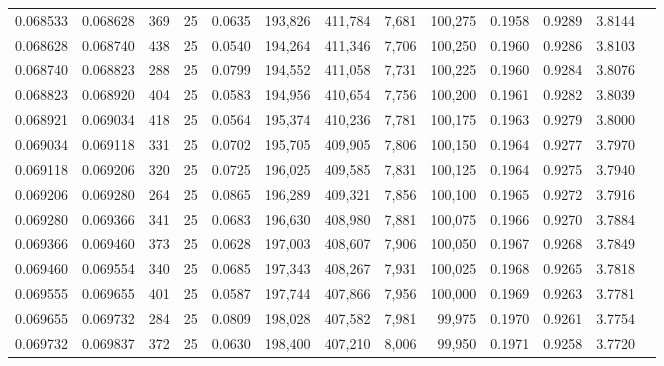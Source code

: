 \begin{tabular}{rrrrrrrrrrrrr}
0.068533 & 0.068628 &   369 &  25 &                                     0.0635 & 193,826 & 411,784 &   7,681 & 100,275 & 0.1958 & 0.9289 & 3.8144 \\
0.068628 & 0.068740 &   438 &  25 &                                     0.0540 & 194,264 & 411,346 &   7,706 & 100,250 & 0.1960 & 0.9286 & 3.8103 \\
0.068740 & 0.068823 &   288 &  25 &                                     0.0799 & 194,552 & 411,058 &   7,731 & 100,225 & 0.1960 & 0.9284 & 3.8076 \\
0.068823 & 0.068920 &   404 &  25 &                                     0.0583 & 194,956 & 410,654 &   7,756 & 100,200 & 0.1961 & 0.9282 & 3.8039 \\
0.068921 & 0.069034 &   418 &  25 &                                     0.0564 & 195,374 & 410,236 &   7,781 & 100,175 & 0.1963 & 0.9279 & 3.8000 \\
0.069034 & 0.069118 &   331 &  25 &                                     0.0702 & 195,705 & 409,905 &   7,806 & 100,150 & 0.1964 & 0.9277 & 3.7970 \\
0.069118 & 0.069206 &   320 &  25 &                                     0.0725 & 196,025 & 409,585 &   7,831 & 100,125 & 0.1964 & 0.9275 & 3.7940 \\
0.069206 & 0.069280 &   264 &  25 &                                     0.0865 & 196,289 & 409,321 &   7,856 & 100,100 & 0.1965 & 0.9272 & 3.7916 \\
0.069280 & 0.069366 &   341 &  25 &                                     0.0683 & 196,630 & 408,980 &   7,881 & 100,075 & 0.1966 & 0.9270 & 3.7884 \\
0.069366 & 0.069460 &   373 &  25 &                                     0.0628 & 197,003 & 408,607 &   7,906 & 100,050 & 0.1967 & 0.9268 & 3.7849 \\
0.069460 & 0.069554 &   340 &  25 &                                     0.0685 & 197,343 & 408,267 &   7,931 & 100,025 & 0.1968 & 0.9265 & 3.7818 \\
0.069555 & 0.069655 &   401 &  25 &                                     0.0587 & 197,744 & 407,866 &   7,956 & 100,000 & 0.1969 & 0.9263 & 3.7781 \\
0.069655 & 0.069732 &   284 &  25 &                                     0.0809 & 198,028 & 407,582 &   7,981 &  99,975 & 0.1970 & 0.9261 & 3.7754 \\
0.069732 & 0.069837 &   372 &  25 &                                     0.0630 & 198,400 & 407,210 &   8,006 &  99,950 & 0.1971 & 0.9258 & 3.7720 \\

\end{tabular}
